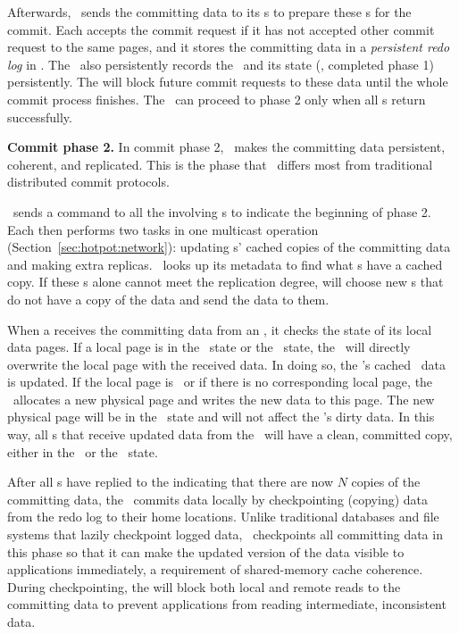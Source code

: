 Afterwards, \xn\ sends the committing data to its \on{}s 
to prepare these \on{}s for the commit.
Each \on{} accepts the commit request if it has not accepted other commit request to the same pages,
and it stores the committing data in a {\em persistent redo log} in \nvm.
The \on\ also persistently records the \xactid\ and its state (\ie, completed phase 1) persistently.
The \on{} will block future commit requests to these data until the whole commit process finishes.
The \xn\ can proceed to phase 2 only when all \on{}s return successfully.

{\bf Commit phase 2.}
In commit phase 2, \hotpot\ makes the committing data persistent, 
coherent, and replicated.
This is the phase that \hotpot\ differs most from traditional distributed commit protocols.

\xn\ sends a command to all the involving \on{}s to indicate the beginning of phase 2.  
Each \on{} then performs two tasks in one multicast operation (Section~\ref{sec:hotpot:network}): 
updating \dn{}s' cached copies of the committing data and making extra replicas.
\on\ looks up its metadata to find what \dn{}s have a cached copy.
If these \dn{}s alone cannot meet the replication degree, \on{} will choose new \dn{}s that do not have
a copy of the data and send the data to them.

When a \dn{} receives the committing data from an \on,
it checks the state of its local data pages.
If a local page is in the \committed\ state or the \redundant\ state, 
the \dn\ will directly overwrite the local page with the received data.
In doing so, the \dn's cached \nvm\ data is updated.
If the local page is \dirty\  or if there is no corresponding local page,
the \dn\ allocates a new physical page and writes the new data to this page.
The new physical page will be in the \redundant\ state and will not affect the \dn's dirty data.
In this way, all \dn{}s that receive updated data from the \on\ will 
have a clean, committed copy, either in the \committed\ or the \redundant\ state.

After all \dn{}s have replied to the \on{} indicating that there are now $N$ copies of the committing data,
the \on\ commits data locally
by checkpointing (copying) data from the redo log to their home locations.
Unlike traditional databases and file systems that lazily checkpoint logged data, 
\hotpot\ checkpoints all committing data in this phase 
so that it can make the updated version of the data
visible to applications immediately, 
a requirement of shared-memory cache coherence.
During checkpointing, the \on{} will block both local and remote reads to the committing data
to prevent applications from reading intermediate, inconsistent data.

